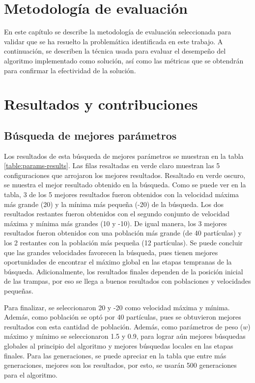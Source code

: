 \documentclass[letterpaper]{report}
\begin{document}
\chapter{Metodología de evaluación}

  En este capítulo se describe la metodología de evaluación seleccionada para
  validar que se ha resuelto la problemática identificada en este trabajo. A
  continuación, se describen la técnica usada para evaluar el desempeño del
  algoritmo implementado como solución, así como las métricas que se obtendrán
  para confirmar la efectividad de la solución.


\chapter{Resultados y contribuciones}

  \section{Búsqueda de mejores parámetros}\label{sect:busqueda-mejores-params}
    Los resultados de esta búsqueda de mejores parámetros se muestran en la
    tabla \ref{table:params-results}. Las filas resaltadas en verde claro
    muestran las 5 configuraciones que arrojaron los mejores resultados.
    Resaltado en verde oscuro, se muestra el mejor resultado obtenido en la
    búsqueda. Como se puede ver en la tabla, 3 de los 5 mejores resultados
    fueron obtenidos con la velocidad máxima más grande (20) y la mínima más
    pequeña (-20) de la búsqueda. Los dos resultados restantes fueron obtenidos
    con el segundo conjunto de velocidad máxima y mínima más grandes (10 y -10).
    De igual manera, los 3 mejores resultados fueron obtenidos con una población
    más grande (de 40 partículas) y los 2 restantes con la población más pequeña
    (12 partículas). Se puede concluir que las grandes velocidades favorecen la
    búsqueda, pues tienen mejores oportunidades de encontrar el máximo global en
    las etapas tempranas de la búsqueda. Adicionalmente, los resultados finales
    dependen de la posición inicial de las trampas, por eso se llega a buenos
    resultados con poblaciones y velocidades pequeñas. 

    Para finalizar, se seleccionaron 20 y -20 como velocidad máxima
    y mínima. Además, como población se optó por 40 partículas, pues se
    obtuvieron mejores resultados con esta cantidad de población.
    Además, como parámetros de peso ($w$) máximo y mínimo se seleccionaron 1.5 y
    0.9, para lograr aún mejores búsquedas globales al principio del algoritmo y
    mejores búsquedas locales en las etapas finales. Para las generaciones, se
    puede apreciar en la tabla que entre más generaciones, mejores son los
    resultados, por esto, se usarán 500 generaciones para el algoritmo.
    
\end{document}
